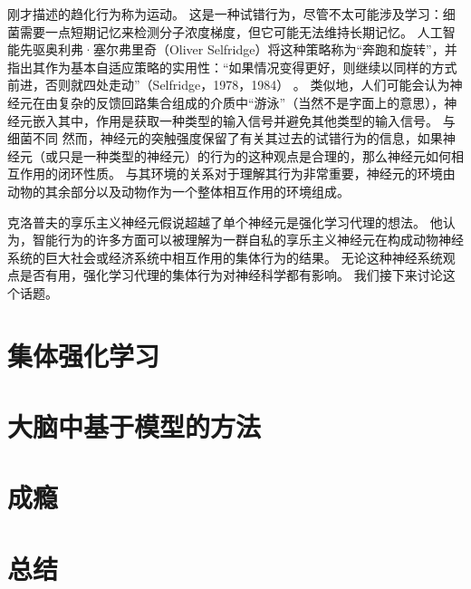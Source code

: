 刚才描述的趋化行为称为运动。
这是一种试错行为，尽管不太可能涉及学习：细菌需要一点短期记忆来检测分子浓度梯度，但它可能无法维持长期记忆。
人工智能先驱奥利弗·塞尔弗里奇（Oliver Selfridge）将这种策略称为“奔跑和旋转”，并指出其作为基本自适应策略的实用性：“如果情况变得更好，则继续以同样的方式前进，否则就四处走动”（Selfridge，1978，1984） 。
类似地，人们可能会认为神经元在由复杂的反馈回路集合组成的介质中“游泳”（当然不是字面上的意思），神经元嵌入其中，作用是获取一种类型的输入信号并避免其他类型的输入信号。
与细菌不同 然而，神经元的突触强度保留了有关其过去的试错行为的信息，如果神经元（或只是一种类型的神经元）的行为的这种观点是合理的，那么神经元如何相互作用的闭环性质。
与其环境的关系对于理解其行为非常重要，神经元的环境由动物的其余部分以及动物作为一个整体相互作用的环境组成。


克洛普夫的享乐主义神经元假说超越了单个神经元是强化学习代理的想法。
他认为，智能行为的许多方面可以被理解为一群自私的享乐主义神经元在构成动物神经系统的巨大社会或经济系统中相互作用的集体行为的结果。
无论这种神经系统观点是否有用，强化学习代理的集体行为对神经科学都有影响。
我们接下来讨论这个话题。


\section{集体强化学习} \label{sec:collective_rl}


\section{大脑中基于模型的方法}


\section{成瘾}


\section{总结}










